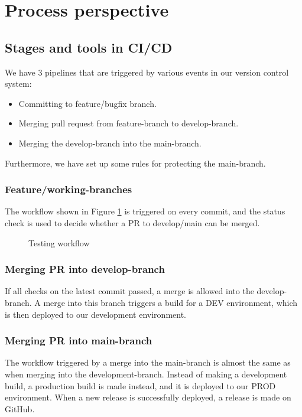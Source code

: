 \section{Process perspective} \label{pp}

\subsection{Stages and tools in CI/CD} %
We have 3 pipelines that are triggered by various events in our  version control system:
\begin{itemize}
    \item Committing to feature/bugfix branch.
    \item Merging pull request from feature-branch to develop-branch.
    \item Merging the develop-branch into the main-branch.
\end{itemize}
Furthermore, we have set up some rules for protecting the main-branch.

\subsubsection*{Feature/working-branches}
The workflow shown in Figure \ref{fig:test-workflow} is triggered on every commit, and the status check is used to decide whether a PR to develop/main can be merged.
\begin{figure}[h!]
  \centering 
  
  \caption{Testing workflow}
  \label{fig:test-workflow}
\end{figure}

\subsubsection*{Merging PR into develop-branch}
If all checks on the latest commit passed, a merge is allowed into the develop-branch. A merge into this branch triggers a build for a DEV environment, which is then deployed to our development environment.

\subsubsection*{Merging PR into main-branch}
The workflow triggered by a merge into the main-branch is almost the same as when merging into the development-branch. Instead of making a development build, a production build is made instead, and it is deployed to our PROD environment. When a new release is successfully deployed, a release is made on GitHub.

